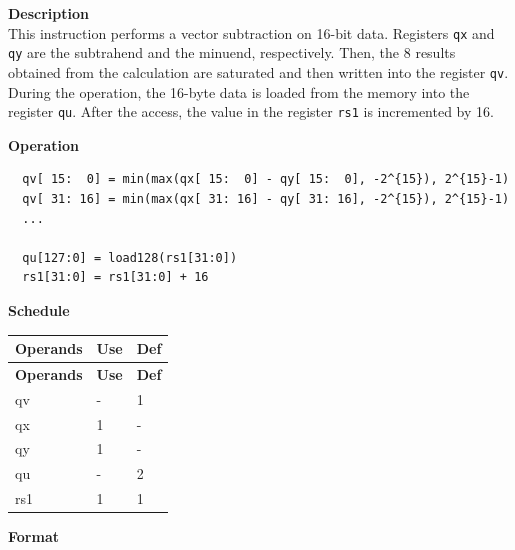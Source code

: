 \textbf{Description}\\
This instruction performs a vector subtraction on 16-bit data. Registers \lstinline{qx} and \lstinline{qy} are the subtrahend and the minuend, respectively. Then, the 8 results obtained from the calculation are saturated and then written into the register \lstinline{qv}. \\ During the operation, the 16-byte data is loaded from the memory into the register \lstinline{qu}. After the access, the value in the register \lstinline{rs1} is incremented by 16.

\textbf{Operation}\\
\begin{lstlisting}
  qv[ 15:  0] = min(max(qx[ 15:  0] - qy[ 15:  0], -2^{15}), 2^{15}-1)
  qv[ 31: 16] = min(max(qx[ 31: 16] - qy[ 31: 16], -2^{15}), 2^{15}-1)
  ...

  qu[127:0] = load128(rs1[31:0])
  rs1[31:0] = rs1[31:0] + 16
\end{lstlisting}


\textbf{Schedule}\\
\begin{longtable}[c]{|l|l|l|}
    \hline
    \rowcolor{lightgray}
    \textbf{Operands} & \textbf{Use} & \textbf{Def} \\\hline
    \endfirsthead
    \hline
    \rowcolor{lightgray}
     \textbf{Operands} & \textbf{Use} & \textbf{Def} \\\hline
    \endhead
    \hline
    \endfoot

  qv & - & 1 \\\hline
    qx & 1 & - \\\hline
    qy & 1 & - \\\hline
    qu & - & 2 \\\hline
    rs1 & 1 & 1

\end{longtable}

\textbf{Format}\\

